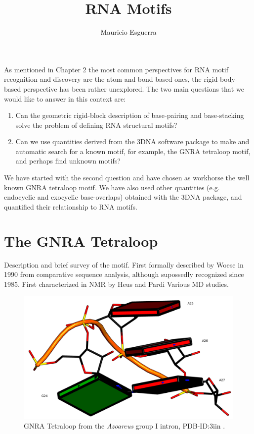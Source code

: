 \documentclass[10pt, oneside, pdftex]{article}
\begin{document}
\title{RNA Motifs}
\author{Mauricio Esguerra}
\maketitle

As mentioned in  Chapter 2 the most common  perspectives for RNA motif
recognition  and  discovery are  the  atom  and  bond based  ones, the
rigid-body-based perspective has been  rather unexplored. The two main
questions that we would like to answer in this context are:

\begin{enumerate}
\item{Can  the geometric rigid-block  description of  base-pairing and
  base-stacking solve the problem of defining RNA structural motifs?}
\item{Can we use quantities derived  from the 3DNA software package to
  make and automatic  search for a known motif,  for example, the GNRA
  tetraloop motif, and perhaps find unknown motifs?}
\end{enumerate}

We have  started with  the second  question and have  chosen as
workhorse the well known GNRA tetraloop motif. We have also used other
quantities  (e.g.  endocyclic  and  exocyclic base-overlaps)  obtained
with  the 3DNA  \cite{lu2003, lu2008b}  package, and  quantified their
relationship to RNA motifs.

\section{The GNRA Tetraloop}
Description and brief survey of the motif.
First  formally  described  by  Woese \cite{woese1990}  in  1990  from
comparative  sequence analysis,  although supossedly  recognized since
1985. First characterized in NMR by Heus and Pardi \cite{heus1991}
Various MD studies.
\cite{depaul2010}


\begin{figure}
\centering 
\includegraphics[angle=0, scale=2]{gnra24.png}
\caption{GNRA Tetraloop from the \textit{Azoarcus} group I intron,
  PDB-ID:3iin   \cite{antonioli2010}.}
\end{figure}
\end{document}
